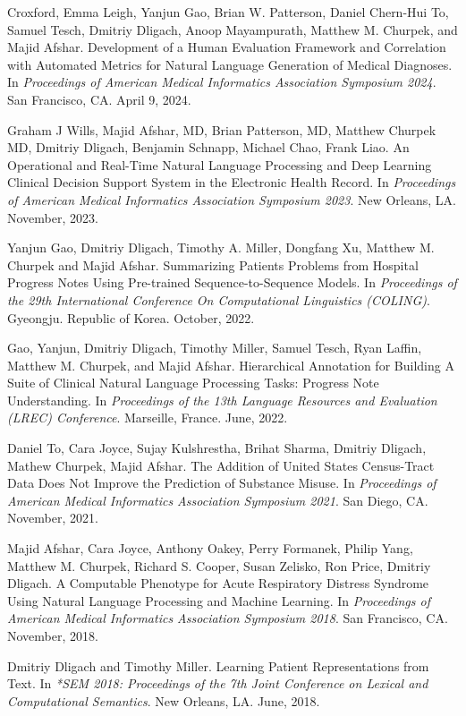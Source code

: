 \documentclass[letterpaper]{article}
\renewenvironment{itemize}{
  \begin{list}{}{
    \setlength{\leftmargin}{1.5em}
  }
}{
  \end{list}
}
\begin{document}
\begin{itemize}
\item Croxford, Emma Leigh, Yanjun Gao, Brian W. Patterson, Daniel Chern-Hui To, Samuel Tesch, Dmitriy Dligach, Anoop Mayampurath, Matthew M. Churpek, and Majid Afshar. Development of a Human Evaluation Framework and Correlation with Automated Metrics for Natural Language Generation of Medical Diagnoses. In \emph{Proceedings of American Medical Informatics Association Symposium 2024}. San Francisco, CA. April 9, 2024.
\item Graham J Wills, Majid Afshar, MD, Brian Patterson, MD, Matthew Churpek MD, Dmitriy Dligach, Benjamin Schnapp, Michael Chao, Frank Liao. An Operational and Real-Time Natural Language Processing and Deep Learning Clinical Decision Support System in the Electronic Health Record. In \emph{Proceedings of American Medical Informatics Association Symposium 2023}. New Orleans, LA. November, 2023.
\item Yanjun Gao, Dmitriy Dligach, Timothy A. Miller, Dongfang Xu, Matthew M. Churpek and Majid Afshar. Summarizing Patients Problems from Hospital Progress Notes Using Pre-trained Sequence-to-Sequence Models. In \emph{Proceedings of the 29th International Conference On Computational Linguistics (COLING)}. Gyeongju. Republic of Korea. October, 2022.
\item Gao, Yanjun, Dmitriy Dligach, Timothy Miller, Samuel Tesch, Ryan Laffin, Matthew M. Churpek, and Majid Afshar. Hierarchical Annotation for Building A Suite of Clinical Natural Language Processing Tasks: Progress Note Understanding. In \emph{Proceedings of the 13th Language Resources and Evaluation (LREC) Conference}. Marseille, France. June, 2022.
\item Daniel To, Cara Joyce, Sujay Kulshrestha, Brihat Sharma, Dmitriy Dligach, Mathew Churpek, Majid Afshar. The Addition of United States Census-Tract Data Does Not Improve the Prediction of Substance Misuse. In \emph{Proceedings of American Medical Informatics Association Symposium 2021}. San Diego, CA. November, 2021.
\item Majid Afshar, Cara Joyce, Anthony Oakey, Perry Formanek, Philip Yang, Matthew M. Churpek, Richard S. Cooper, Susan Zelisko, Ron Price, Dmitriy Dligach. A Computable Phenotype for Acute Respiratory Distress Syndrome Using Natural Language Processing and Machine Learning. In \emph{Proceedings of American Medical Informatics Association Symposium 2018}. San Francisco, CA. November, 2018.
\item Dmitriy Dligach and Timothy Miller. Learning Patient Representations from Text. In \emph{*SEM 2018: Proceedings of the 7th Joint Conference on Lexical and Computational Semantics}. New Orleans, LA. June, 2018.

\end{itemize}
\end{document}
